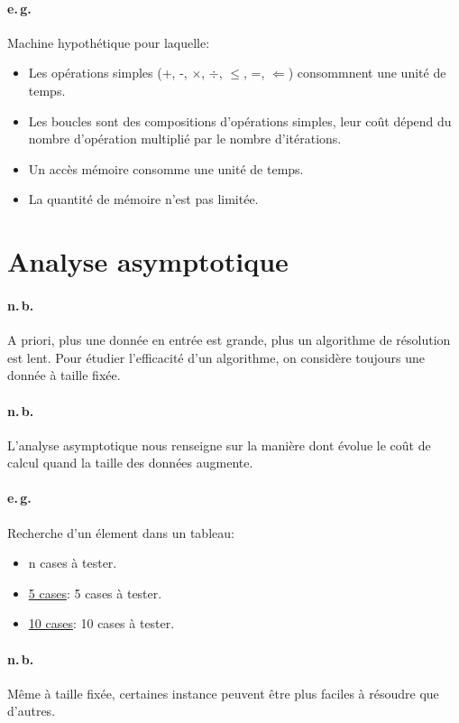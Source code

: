 \documentclass{report}
\begin{document}
    \paragraph{e.\,g.} Machine hypothétique pour laquelle:
    \begin{itemize}
      \item Les opérations simples (+, -, $\times$, $\div$, $\leq$, =, $\Leftarrow$) consommnent une unité de temps.
      \item Les boucles sont des compositions d'opérations simples, leur coût dépend du nombre d'opération multiplié par le nombre d'itérations.
      \item Un accès mémoire consomme une unité de temps.
      \item La quantité de mémoire n'est pas limitée.
    \end{itemize}

  \section{Analyse asymptotique}

    \paragraph{n.\,b.} A priori, plus une donnée en entrée est grande, plus un algorithme de résolution est lent. Pour étudier l'efficacité d'un algorithme, on considère toujours une donnée à taille fixée.

    \paragraph{n.\,b.} L'analyse asymptotique nous renseigne sur la manière dont évolue le coût de calcul quand la taille des données augmente.

    \paragraph{e.\,g.} Recherche d'un élement dans un tableau:
    \begin{itemize}
      \item n cases à tester.
      \item \underline{5 cases}: 5 cases à tester.
      \item \underline{10 cases}: 10 cases à tester.
    \end{itemize}

    \paragraph{n.\,b.} Même à taille fixée, certaines instance peuvent être plus faciles à résoudre que d'autres.
\end{document}
